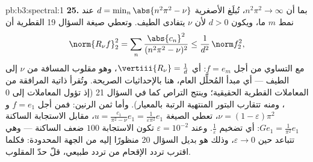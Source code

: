 \begin{solution}{pb:b3:spectral:1}
\textbf{25.} بما أن $n^2\pi^2 \to \infty$، تُبلَغ الأصغرية $d =
\min_n\abs{n^2\pi^2 - \nu}$ عند نمط
$m$ ما، ويكون $d > 0$ لأن $\nu$ يتفادى الطيف. وتعطي صيغة السؤال
19 القطرية أن
\[
\norm{R_\nu f}_2^2 =
\sum_n\frac{\abs{c_n}^2}{(n^2\pi^2 - \nu)^2}
\leq \frac1{d^2}\,\norm f_2^2,
\]
مع التساوي من أجل $f = e_m$: أي $\vertiii{R_\nu} = \frac1d$، وهو مقلوب المسافة من
$\nu$ إلى الطيف --- أي مبدأ المُحلِّل العام، هنا بالإحداثيات
الصريحة. وتُقرأ ذاتية المرافقة من المعاملات القطرية الحقيقية؛
وينتج التراص كما في السؤال 21 (إذ تؤول المعاملات إلى $0$، ومنه
تتقارب البتور المنتهية الرتبة بالمعيار). وأما ثمن الرنين: فمن
أجل $f = e_1$ و $\nu =
(1-\varepsilon)\pi^2$، تعطي الصيغة $u =
\frac{c_1}{\pi^2 - \nu}e_1 = \frac1{\varepsilon\pi^2}e_1$، مقابل الاستجابة
الساكنة $Ge_1 = \frac1{\pi^2}e_1$: أي تضخيم $\frac1\varepsilon$. وعند $\varepsilon =
10^{-2}$ تكون الاستجابة
$100$ ضعف الساكنة --- وهي تتباعد حين $\varepsilon \to 0$، وذلك هو بديل
السؤال 20 منظورًا إليه من الجهة المحدودة: فكلما اقترب تردد
الإقحام من تردد طبيعي، قلّ حدّ المقلوب.
\end{solution}
